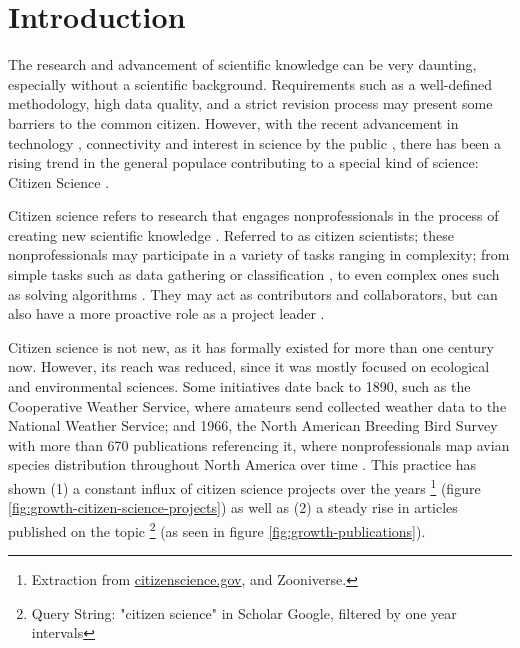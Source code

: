 \chapter*[Introduction]{Introduction}
\label{chap:introduction}

The research and advancement of scientific knowledge can be very daunting, especially without a scientific background. Requirements such as a well-defined methodology, high data quality, and a strict revision process may present some barriers to the common citizen. However, with the recent advancement in technology \cite{newman2012future}, connectivity \cite{newman2012future} and interest in science by the public \cite{silvertown2009new}, there has been a rising trend in the general populace contributing to a special kind of science: Citizen Science \cite{mckinley2017citizen}.

Citizen science refers to research that engages nonprofessionals in the process of creating new scientific knowledge \cite{bonney2014next}. Referred to as citizen scientists; these nonprofessionals may participate in a variety of tasks ranging in complexity; from simple tasks such as data gathering or classification \cite{barker2013pascal}, to even complex ones such as solving algorithms \cite{cooper2010predicting}. They may act as contributors and collaborators, but can also have a more proactive role as a project leader \cite{robinson2018ten}.

Citizen science is not new, as it has formally existed for more than one century now. However, its reach was reduced, since it was mostly focused on ecological and environmental sciences. Some initiatives date back to 1890, such as the Cooperative Weather Service, where amateurs send collected weather data to the National Weather Service; and 1966, the North American Breeding Bird Survey with more than 670 publications referencing it, where nonprofessionals map avian species distribution throughout North America over time \cite{kosmala2016assessing}. This practice has shown (1) a constant influx of citizen science projects over the years \footnote{Extraction from \url{citizenscience.gov}, and Zooniverse.} (figure \ref{fig:growth-citizen-science-projects}) as well as (2) a steady rise in articles published on the topic \footnote{Query String: "citizen science" in Scholar Google, filtered by one year intervals} (as seen in figure \ref{fig:growth-publications}).

\publicationdata

